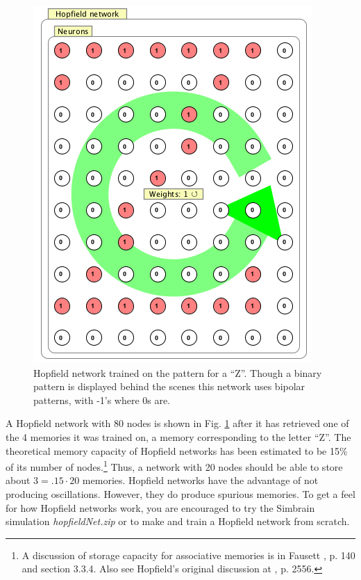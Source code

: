 \begin{figure}[h]
\centering
\includegraphics[scale=.34]{./images/Hopfield.png}
\caption[Simbrain screenshot]{Hopfield network trained on the pattern for a ``Z''. Though a binary pattern is displayed behind the scenes this network uses bipolar patterns, with -1's where 0s are.}
\label{F:hopfield}
\end{figure}

A Hopfield network with 80 nodes is shown in Fig. \ref{F:hopfield} after it has retrieved one of the 4 memories it was trained on, a memory corresponding to the letter ``Z''. The theoretical memory capacity of Hopfield networks has been estimated to be 15\%  of its number of nodes.\footnote{A discussion of storage capacity for associative memories  is in Fausett \cite{fausett1994fundamentals}, p. 140 and section 3.3.4. Also see Hopfield's original discussion at \cite{hopfield1982neural}, p. 2556.}  Thus, a network with 20 nodes should be able to store about $3 = .15 \cdot 20$ memories. Hopfield networks have the advantage of not producing oscillations. However, they do produce spurious memories. To get a feel for how Hopfield networks work, you are encouraged to try the Simbrain simulation \emph{hopfieldNet.zip} or to make and train a Hopfield network from scratch. 
